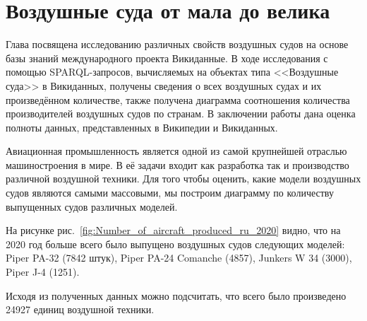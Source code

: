 \chapter{Воздушные суда от мала до велика}%
\label{ch:aircraft-chapter}

Глава посвящена исследованию различных свойств воздушных судов 
на основе базы знаний международного проекта Викиданные. 
В ходе исследования с помощью SPARQL-запросов, вычисляемых на объектах типа <<Воздушные суда>> в Викиданных, 
получены сведения о всех воздушных судах и их произведённом количестве, 
также получена диаграмма соотношения количества производителей воздушных судов по странам. 
В заключении работы дана оценка полноты данных, представленных в Википедии и Викиданных.

Авиационная промышленность является одной из самой крупнейшей отраслью машиностроения в мире. 
В её задачи входит как разработка так и производство различной воздушной техники. 
Для того чтобы оценить, какие модели воздушных судов являются самыми массовыми, 
мы построим диаграмму по количеству выпущенных судов различных моделей.

На рисунке рис.~\ref{fig:Number_of_aircraft_produced_ru_2020} видно, что на 2020 год больше всего было выпущено воздушных судов следующих моделей: Piper PA-32 (7842 штук), Piper PA-24 Comanche (4857), Junkers W 34 (3000), Piper J-4 (1251).


\clearpage
\begin{figure*}[h]

    \setlength{\fboxsep}{0pt}%
    \setlength{\fboxrule}{1pt}%

	\caption{Количество выпущенных воздушных судов по моделям, 2020.}%
    \label{fig:Number_of_aircraft_produced_ru_2020}%
\end{figure*}

Исходя из полученных данных можно подсчитать, что всего было произведено 24927 единиц воздушной техники.
